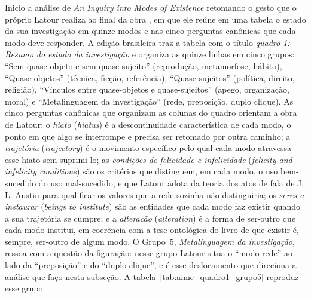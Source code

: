 Inicio a análise de \textit{An Inquiry into Modes of Existence} retomando o gesto que o próprio Latour realiza ao final da obra \parencite[pp.~487--488]{Latour2013Inquiry}, em que ele reúne em uma tabela o estado da sua investigação em quinze modos e nas cinco perguntas canônicas que cada modo deve responder. A edição brasileira \parencite[pp.~392--393]{Latour2019Investigacao} traz a tabela com o título \emph{quadro 1: Resumo do estado da investigação} e organiza as quinze linhas em cinco grupos: \enquote{Sem quase-objeto e sem quase-sujeito} (reprodução, metamorfose, hábito), \enquote{Quase-objetos} (técnica, ficção, referência), \enquote{Quase-sujeitos} (política, direito, religião), \enquote{Vínculos entre quase-objetos e quase-sujeitos} (apego, organização, moral) e \enquote{Metalinguagem da investigação} (rede, preposição, duplo clique). As cinco perguntas canônicas que organizam as colunas do quadro orientam a obra de Latour: o \emph{hiato} (\emph{hiatus}) é a descontinuidade característica de cada modo, o ponto em que algo se interrompe e precisa ser retomado por outra caminho; a \emph{trajetória} (\emph{trajectory}) é o movimento específico pelo qual cada modo atravessa esse hiato sem suprimi-lo; as \emph{condições de felicidade e infelicidade} (\emph{felicity and infelicity conditions}) são os critérios que distinguem, em cada modo, o uso bem-sucedido do uso mal-sucedido, e que Latour adota da teoria dos atos de fala de J. L. Austin para qualificar os valores que a rede sozinha não distinguiria; os \emph{seres a instaurar} (\emph{beings to institute}) são as entidades que cada modo faz existir quando a sua trajetória se cumpre; e a \emph{alteração} (\emph{alteration}) é a forma de ser-outro que cada modo institui, em coerência com a tese ontológica do livro de que existir é, sempre, ser-outro de algum modo. O Grupo~5, \emph{Metalinguagem da investigação}, ressoa com a questão da figuração: nesse grupo Latour situa o \enquote{modo rede} ao lado da \enquote{preposição} e do \enquote{duplo clique}, e é esse deslocamento que direciona a análise que faço nesta subseção. A tabela~\ref{tab:aime_quadro1_grupo5} reproduz esse grupo.

